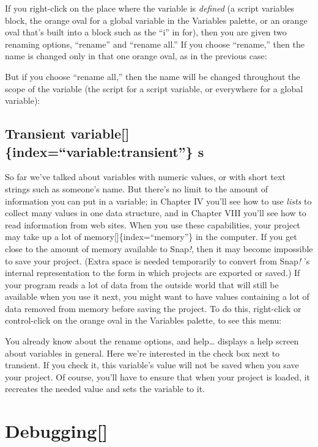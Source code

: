 \documentclass[
  letterpaper,
]{book}
\begin{document}
If you right-click on the place where the variable is \emph{defined} (a
script variables block, the orange oval for a global variable in the
Variables palette, or an orange oval that's built into a block such as
the ``i'' in for), then you are given two renaming options, ``rename''
and ``rename all.'' If you choose ``rename,'' then the name is changed
only in that one orange oval, as in the previous case:

But if you choose ``rename all,'' then the name will be changed
throughout the scope of the variable (the script for a script variable,
or everywhere for a global variable):

\subsection{Transient variable{[}{]}\{index=``variable:transient''\}
s}\label{transient-variableindexvariabletransient-s}

So far we've talked about variables with numeric values, or with short
text strings such as someone's name. But there's no limit to the amount
of information you can put in a variable; in Chapter IV you'll see how
to use \emph{lists} to collect many values in one data structure, and in
Chapter VIII you'll see how to read information from web sites. When you
use these capabilities, your project may take up a lot of
memory{[}{]}\{index=``memory''\} in the computer. If you get close to
the amount of memory available to Snap\emph{!}, then it may become
impossible to save your project. (Extra space is needed temporarily to
convert from Snap\emph{!} 's internal representation to the form in
which projects are exported or saved.) If your program reads a lot of
data from the outside world that will still be available when you use it
next, you might want to have values containing a lot of data removed
from memory before saving the project. To do this, right-click or
control-click on the orange oval in the Variables palette, to see this
menu:

You already know about the rename options, and help\ldots{} displays a
help screen about variables in general. Here we're interested in the
check box next to transient. If you check it, this variable's value will
not be saved when you save your project. Of course, you'll have to
ensure that when your project is loaded, it recreates the needed value
and sets the variable to it.

\section{Debugging{[}{]}}\label{debugging}
\end{document}
